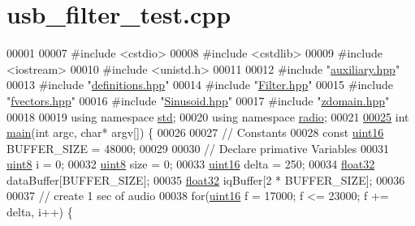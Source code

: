 \hypertarget{usb__filter__test_8cpp_source}{\section{usb\+\_\+filter\+\_\+test.\+cpp}
\label{usb__filter__test_8cpp_source}
}

\begin{DoxyCode}
00001 
00007 \textcolor{preprocessor}{#include <cstdio>}
00008 \textcolor{preprocessor}{#include <cstdlib>}
00009 \textcolor{preprocessor}{#include <iostream>}
00010 \textcolor{preprocessor}{#include <unistd.h>}
00011 
00012 \textcolor{preprocessor}{#include "\hyperlink{auxiliary_8hpp}{auxiliary.hpp}"}
00013 \textcolor{preprocessor}{#include "\hyperlink{definitions_8hpp}{definitions.hpp}"}
00014 \textcolor{preprocessor}{#include "\hyperlink{Filter_8hpp}{Filter.hpp}"}
00015 \textcolor{preprocessor}{#include "\hyperlink{fvectors_8hpp}{fvectors.hpp}"}
00016 \textcolor{preprocessor}{#include "\hyperlink{Sinusoid_8hpp}{Sinusoid.hpp}"}
00017 \textcolor{preprocessor}{#include "\hyperlink{zdomain_8hpp}{zdomain.hpp}"}
00018 
00019 \textcolor{keyword}{using namespace }\hyperlink{namespacestd}{std};
00020 \textcolor{keyword}{using namespace }\hyperlink{namespaceradio}{radio};
00021 
\hypertarget{usb__filter__test_8cpp_source_l00025}{}\hyperlink{usb__filter__test_8cpp_a0ddf1224851353fc92bfbff6f499fa97}{00025} \textcolor{keywordtype}{int} \hyperlink{usb__filter__test_8cpp_a0ddf1224851353fc92bfbff6f499fa97}{main}(\textcolor{keywordtype}{int} argc, \textcolor{keywordtype}{char}* argv[]) \{
00026 
00027     \textcolor{comment}{// Constants}
00028     \textcolor{keyword}{const} \hyperlink{definitions_8hpp_a05f6b0ae8f6a6e135b0e290c25fe0e4e}{uint16} BUFFER\_SIZE = 48000;
00029 
00030     \textcolor{comment}{// Declare primative Variables}
00031     \hyperlink{definitions_8hpp_adde6aaee8457bee49c2a92621fe22b79}{uint8} i = 0;
00032     \hyperlink{definitions_8hpp_adde6aaee8457bee49c2a92621fe22b79}{uint8} size = 0;
00033     \hyperlink{definitions_8hpp_a05f6b0ae8f6a6e135b0e290c25fe0e4e}{uint16} delta = 250;
00034     \hyperlink{definitions_8hpp_aacdc525d6f7bddb3ae95d5c311bd06a1}{float32} dataBuffer[BUFFER\_SIZE];
00035     \hyperlink{definitions_8hpp_aacdc525d6f7bddb3ae95d5c311bd06a1}{float32} iqBuffer[2 * BUFFER\_SIZE];
00036 
00037     \textcolor{comment}{// create 1 sec of audio}
00038     \textcolor{keywordflow}{for}(\hyperlink{definitions_8hpp_a05f6b0ae8f6a6e135b0e290c25fe0e4e}{uint16} f = 17000; f <= 23000; f += delta, i++) \{

\end{DoxyCode}
